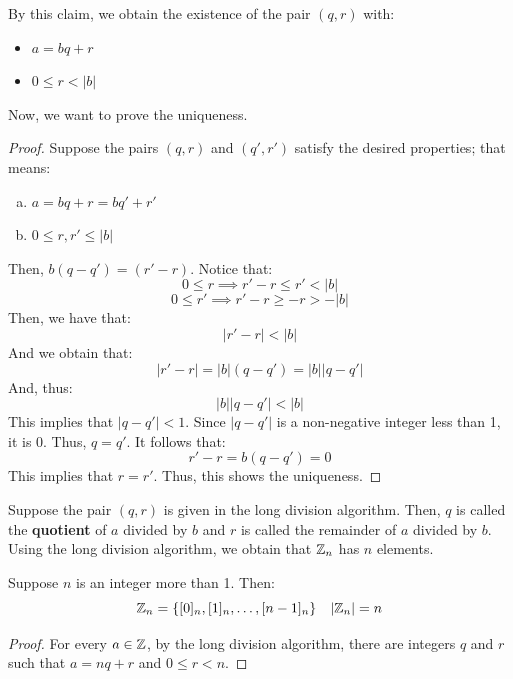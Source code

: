 \documentclass[letterpaper]{article}
\begin{document}
By this claim, we obtain the existence of the pair $(q, r)$ with:
\begin{itemize}
    \item $a = bq + r$
    \item $0 \leq r < |b|$
\end{itemize}
Now, we want to prove the uniqueness.
\begin{framed}
    \begin{proof}
        Suppose the pairs $(q, r)$ and $(q', r')$ satisfy the desired properties; that means:
        \begin{enumerate}[(a)]
            \item $a = bq + r = bq' + r'$
            \item $0 \leq r, r' \leq |b|$
        \end{enumerate}
        Then, $b(q - q') = (r' - r)$. Notice that:
        \[0 \leq r \implies r' - r \leq r' < |b|\]
        \[0 \leq r' \implies r' - r \geq -r > -|b|\]
        Then, we have that:
        \[|r' - r| < |b|\]
        And we obtain that:
        \[|r' - r| = |b|(q - q') = |b| |q - q'|\]
        And, thus:
        \[|b||q - q'| < |b|\]
        This implies that $|q - q'| < 1$. Since $|q - q'|$ is a non-negative integer less than 1, it is 0. Thus, $q = q'$. It follows that:
        \[r' - r = b(q - q') = 0\]
        This implies that $r = r'$. Thus, this shows the uniqueness. 
    \end{proof}
\end{framed}

Suppose the pair $(q, r)$ is given in the long division algorithm. Then, $q$ is called the \textbf{quotient} of $a$ divided by $b$ and $r$ is called the remainder of $a$ divided by $b$. Using the long division algorithm, we obtain that $\mathbb{Z}_n$ has $n$ elements. 

\begin{proposition}
    Suppose $n$ is an integer more than 1. Then:
    \[\mathbb{Z}_n = \{[0]_n, [1]_n, \dots, [n - 1]_n\} \quad |\mathbb{Z}_n| = n\]
\end{proposition}
\begin{framed}
    \begin{proof}
        For every $a \in \mathbb{Z}$, by the long division algorithm, there are integers $q$ and $r$ such that $a = nq + r$ and $0 \leq r < n$. 
    \end{proof}
\end{framed}


\end{document}
